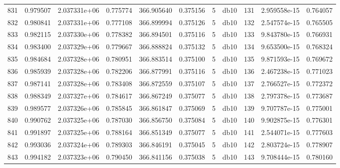 \begin{tabular}{lrrrrrrlrrr}
831  &    0.979507 &        2.037331e+06 &  0.775774 &              366.905640 &    0.375156 &       5 &         db10 &    131 &   2.959558e-15 &      0.764057 \\
832  &    0.980841 &        2.037331e+06 &  0.777108 &              366.899994 &    0.375126 &       5 &         db10 &    132 &   2.547574e-15 &      0.765505 \\
833  &    0.982115 &        2.037330e+06 &  0.778382 &              366.894501 &    0.375116 &       5 &         db10 &    133 &   9.843780e-15 &      0.766931 \\
834  &    0.983400 &        2.037329e+06 &  0.779667 &              366.888824 &    0.375132 &       5 &         db10 &    134 &   9.653500e-15 &      0.768324 \\
835  &    0.984684 &        2.037328e+06 &  0.780951 &              366.883514 &    0.375100 &       5 &         db10 &    135 &   9.871593e-15 &      0.769672 \\
836  &    0.985939 &        2.037328e+06 &  0.782206 &              366.877991 &    0.375116 &       5 &         db10 &    136 &   2.467238e-15 &      0.771023 \\
837  &    0.987141 &        2.037328e+06 &  0.783408 &              366.872559 &    0.375107 &       5 &         db10 &    137 &   2.766527e-15 &      0.772372 \\
838  &    0.988349 &        2.037327e+06 &  0.784617 &              366.867249 &    0.375077 &       5 &         db10 &    138 &   2.797378e-15 &      0.773687 \\
839  &    0.989577 &        2.037326e+06 &  0.785845 &              366.861847 &    0.375069 &       5 &         db10 &    139 &   9.707787e-15 &      0.775001 \\
840  &    0.990762 &        2.037325e+06 &  0.787030 &              366.856750 &    0.375084 &       5 &         db10 &    140 &   9.902875e-15 &      0.776301 \\
841  &    0.991897 &        2.037325e+06 &  0.788164 &              366.851349 &    0.375077 &       5 &         db10 &    141 &   2.544071e-15 &      0.777603 \\
842  &    0.993036 &        2.037324e+06 &  0.789303 &              366.846191 &    0.375045 &       5 &         db10 &    142 &   2.803724e-15 &      0.778907 \\
843  &    0.994182 &        2.037323e+06 &  0.790450 &              366.841156 &    0.375038 &       5 &         db10 &    143 &   9.708444e-15 &      0.780160 \\

\end{tabular}
